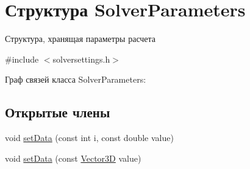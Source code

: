 \hypertarget{struct_solver_parameters}{}\section{Структура Solver\+Parameters}
\label{struct_solver_parameters}


Структура, хранящая параметры расчета  




{\ttfamily \#include $<$solversettings.\+h$>$}



Граф связей класса Solver\+Parameters\+:
\subsection*{Открытые члены}
\begin{DoxyCompactItemize}
\item 
void \mbox{\hyperlink{struct_solver_parameters_a431f8f2054ae8676047e49a008aeb97d}{set\+Data}} (const int i, const double value)
\item 
void \mbox{\hyperlink{struct_solver_parameters_a22cff4b592233c4e09d5d9e9de8e3265}{set\+Data}} (const \mbox{\hyperlink{class_vector3_d}{Vector3D}} value)
\end{DoxyCompactItemize}
